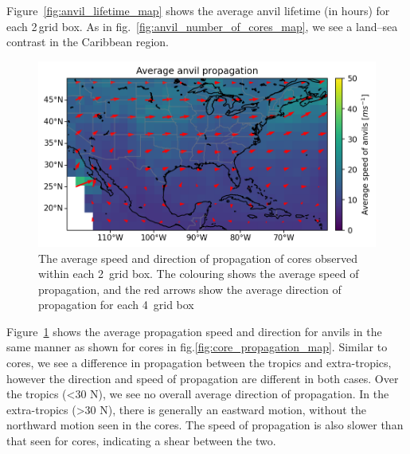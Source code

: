 Figure~\ref{fig:anvil_lifetime_map} shows the average anvil lifetime (in hours) for each 2\,\textdegree grid box.
As in fig.~\ref{fig:anvil_number_of_cores_map}, we see a land--sea contrast in the Caribbean region.


\begin{figure}[tp]
    \centering
    \includegraphics[width=\textwidth]{figures/ch2_15.png}
    \caption[
    The average speed and direction of propagation of anvils
    ]{
    The average speed and direction of propagation of cores observed within each 2\textdegree\ grid box. The colouring shows the average speed of propagation, and the red arrows show the average direction of propagation for each 4\textdegree\ grid box
    }
    \label{fig:anvil_propagation_map}
\end{figure}

Figure~\ref{fig:anvil_propagation_map} shows the average propagation speed and direction for anvils in the same manner as shown for cores in fig.\ref{fig:core_propagation_map}.
Similar to cores, we see a difference in propagation between the tropics and extra-tropics, however the direction and speed of propagation are different in both cases.
Over the tropics (\textless30\,\textdegree\,N), we see no overall average direction of propagation.
In the extra-tropics (\textgreater30\,\textdegree\,N), there is generally an eastward motion, without the northward motion seen in the cores.
The speed of propagation is also slower than that seen for cores, indicating a shear between the two.

